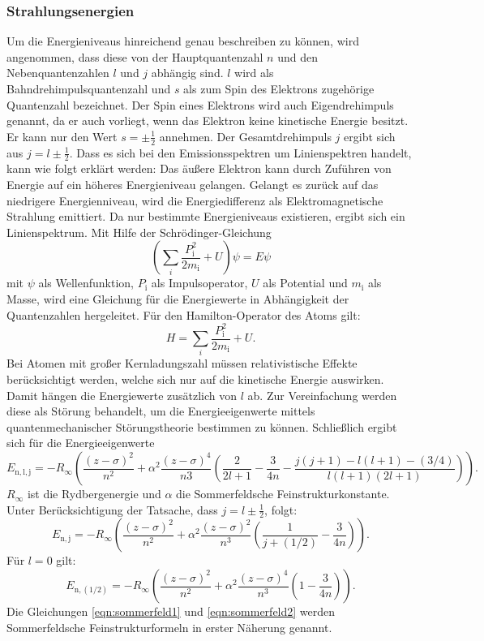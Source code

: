 \subsubsection{Strahlungsenergien}
Um die Energieniveaus hinreichend genau beschreiben zu können, wird angenommen, dass diese von der Hauptquantenzahl $n$ und den Nebenquantenzahlen $l$ und $j$ abhängig sind. $l$ wird als Bahndrehimpulsquantenzahl und $s$ als zum Spin des Elektrons zugehörige Quantenzahl bezeichnet. Der Spin eines Elektrons wird auch Eigendrehimpuls genannt, da er auch vorliegt, wenn das Elektron keine kinetische Energie besitzt. Er kann nur den Wert $s=\pm\frac{1}{2}$ annehmen. Der Gesamtdrehimpuls $j$ ergibt sich aus $j = l\pm\frac{1}{2}$.
Dass es sich bei den Emissionsspektren um Linienspektren handelt, kann wie folgt erklärt werden:
Das äußere Elektron kann durch Zuführen von Energie auf ein höheres Energieniveau gelangen. Gelangt es zurück auf das niedrigere Energienniveau, wird die Energiedifferenz als Elektromagnetische Strahlung emittiert. Da nur bestimmte Energieniveaus existieren, ergibt sich ein Linienspektrum.
Mit Hilfe der Schrödinger-Gleichung
\begin{equation}
  \left(\sum_{i}\frac{P_\mathrm{i}^2}{2m_\mathrm{i}}+U\right)\psi =  E\psi
\end{equation}
mit $\psi$ als Wellenfunktion, $P_\mathrm{i}$ als Impulsoperator, $U$ als Potential und $m_\mathrm{i}$ als Masse, wird eine Gleichung für die Energiewerte in Abhängigkeit der Quantenzahlen hergeleitet. Für den Hamilton-Operator des Atoms gilt:
\begin{equation}
  H=\sum_{i}\frac{P_\mathrm{i}^2}{2m_\mathrm{i}} + U.
\end{equation}
Bei Atomen mit großer Kernladungszahl müssen relativistische Effekte berücksichtigt werden, welche sich nur auf die kinetische Energie auswirken. Damit hängen die Energiewerte zusätzlich von $l$ ab. Zur Vereinfachung werden diese als Störung behandelt, um die Energieeigenwerte mittels quantenmechanischer Störungstheorie bestimmen zu können. Schließlich ergibt sich für die Energieeigenwerte
\begin{equation}
  E_\mathrm{n,l,j} = -R_\infty \left(\frac{(z-\sigma)^2}{n^2}+\alpha^2\frac{(z-\sigma)^4}{n3}\left(\frac{2}{2l+1}-\frac{3}{4n}-\frac{j(j+1)-l(l+1)-(3/4)}{l(l+1)(2l+1)}\right)\right).
\end{equation}
$R_\infty$ ist die Rydbergenergie und $\alpha$ die Sommerfeldsche Feinstrukturkonstante. Unter Berücksichtigung der Tatsache, dass $j=l \pm \frac{1}{2}$, folgt:
\begin{equation}
  \label{eqn:sommerfeld1}
  E_\mathrm{n,j}= -R_\infty \left(\frac{(z-\sigma)^2}{n^2}+\alpha^2\frac{(z-\sigma)^2}{n^3}\left(\frac{1}{j+(1/2)} -\frac{3}{4n}\right)\right).
\end{equation}
Für $l=0$ gilt:
\begin{equation}
  \label{eqn:sommerfeld2}
  E_\mathrm{n,(1/2)} = -R_\infty \left(\frac{(z-\sigma)^2}{n^2}+\alpha^2\frac{(z-\sigma)^4}{n^3} \left( 1-\frac{3}{4n}\right)\right).
\end{equation}
Die Gleichungen \ref{eqn:sommerfeld1} und \ref{eqn:sommerfeld2} werden Sommerfeldsche Feinstrukturformeln in erster Näherung genannt.

